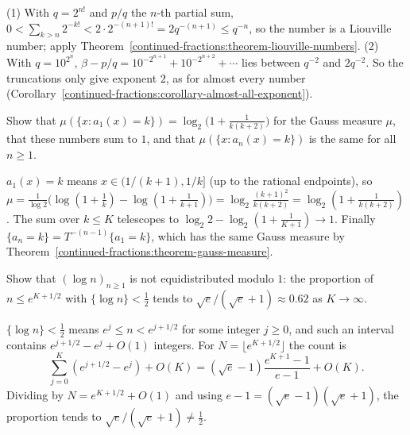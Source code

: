 \begin{solution}
(1) With $q = 2^{n!}$ and $p/q$ the $n$-th partial sum, $0 < \sum_{k > n}2^{-k!} < 2 \cdot 2^{-(n+1)!} = 2q^{-(n+1)} \leq q^{-n}$, so the number is a Liouville number; apply
Theorem~\ref{continued-fractions:theorem-liouville-numbers}. (2) With $q = 10^{2^n}$, $\beta - p/q = 10^{-2^{n+1}} + 10^{-2^{n+2}} + \cdots$ lies between $q^{-2}$ and $2q^{-2}$. So the truncations only
give exponent $2$, as for almost every number (Corollary~\ref{continued-fractions:corollary-almost-all-exponent}).
\end{solution}

\begin{exercise}\label{continued-fractions:exercise-gauss-digits}
Show that $\mu(\{x : a_1(x) = k\}) = \log_2\bigl(1 + \frac{1}{k(k + 2)}\bigr)$ for the Gauss measure $\mu$, that these numbers sum to $1$, and that $\mu(\{x : a_n(x) = k\})$ is the same for all $n \geq 1$.
\end{exercise}

\begin{solution}
$a_1(x) = k$ means $x \in (1/(k + 1), 1/k]$ (up to the rational endpoints), so
$\mu = \frac{1}{\log 2}\bigl(\log(1 + \frac1k) - \log(1 + \frac{1}{k+1})\bigr) = \log_2\frac{(k + 1)^2}{k(k + 2)} = \log_2(1 + \frac{1}{k(k + 2)})$. The sum over $k \leq K$ telescopes to
$\log_2 2 - \log_2(1 + \frac{1}{K + 1}) \to 1$. Finally $\{a_n = k\} = T^{-(n-1)}\{a_1 = k\}$, which has the same Gauss measure by Theorem~\ref{continued-fractions:theorem-gauss-measure}.
\end{solution}

\begin{exercise}\label{continued-fractions:exercise-log-not-equidistributed}
Show that $(\log n)_{n \geq 1}$ is not equidistributed modulo $1$: the proportion of $n \leq e^{K + 1/2}$ with $\{\log n\} < \frac12$ tends to $\sqrt e/(\sqrt e + 1) \approx 0.62$ as $K \to \infty$.
\end{exercise}

\begin{solution}
$\{\log n\} < \frac12$ means $e^j \leq n < e^{j + 1/2}$ for some integer $j \geq 0$, and such an interval contains $e^{j + 1/2} - e^j + O(1)$ integers. For $N = \lfloor e^{K + 1/2} \rfloor$ the count is
\[
\sum_{j=0}^K(e^{j + 1/2} - e^j) + O(K) = (\sqrt e - 1)\frac{e^{K+1} - 1}{e - 1} + O(K).
\]
Dividing by $N = e^{K + 1/2} + O(1)$ and using $e - 1 = (\sqrt e - 1)(\sqrt e + 1)$, the proportion tends to $\sqrt e/(\sqrt e + 1) \neq \frac12$.
\end{solution}

